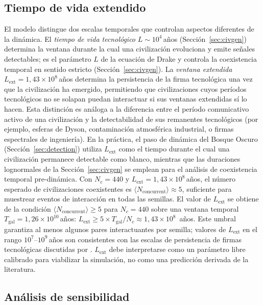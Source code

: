 \documentclass[11pt,a4paper,onecolumn]{article}
\begin{document}
\subsection{Tiempo de vida extendido}
\label{sec:lifetime}

El modelo distingue dos escalas temporales que controlan aspectos
diferentes de la dinámica.
El \emph{tiempo de vida tecnológico} $L \sim 10^4$\,años
(Sección~\ref{sec:civgen}) determina la ventana durante la cual una
civilización evoluciona y emite señales detectables; es el parámetro $L$
de la ecuación de Drake y controla la coexistencia temporal en sentido
estricto (Sección~\ref{sec:civgen}).
La \emph{ventana extendida} $L_\text{ext} = 1{,}43\times10^8$\,años
\citep{sandberg2018} determina la persistencia de la firma tecnológica
una vez que la civilización ha emergido, permitiendo que civilizaciones
cuyos períodos tecnológicos no se solapan puedan interactuar si sus
ventanas extendidas sí lo hacen.
Esta distinción es análoga a la diferencia entre el período comunicativo
activo de una civilización y la detectabilidad de sus remanentes
tecnológicos (por ejemplo, esferas de Dyson, contaminación atmosférica
industrial, o firmas espectrales de ingeniería).
En la práctica, el paso de dinámica del Bosque Oscuro
(Sección~\ref{sec:detection}) utiliza $L_\text{ext}$ como el tiempo
durante el cual una civilización permanece detectable como blanco,
mientras que las duraciones lognormales de la Sección~\ref{sec:civgen}
se emplean para el análisis de coexistencia temporal pre-dinámica.
Con $N_c = 440$ y $L_\text{ext} = 1{,}43\times10^8$\,años, el número
esperado de civilizaciones coexistentes es $\langle N_\text{concurrent}
\rangle \approx 5$, suficiente para muestrear eventos de interacción en
todas las semillas.
El valor de $L_\text{ext}$ se obtiene de la condición
$\langle N_\text{concurrent} \rangle \geq 5$ para $N_c = 440$ sobre una
ventana temporal $T_\text{gal} = 1{,}26\times10^{10}$\,años:
$L_\text{ext} \geq 5 \times T_\text{gal} / N_c \approx 1{,}43\times10^8$
\,años.
Este umbral garantiza al menos algunos pares interactuantes por semilla;
valores de $L_\text{ext}$ en el rango $10^7$--$10^9$\,años son
consistentes con las escalas de persistencia de firmas tecnológicas
discutidas por \citet{sandberg2018}.
$L_\text{ext}$ debe interpretarse como un parámetro libre calibrado
para viabilizar la simulación, no como una predicción derivada de la
literatura.

\subsection{Análisis de sensibilidad}
\label{sec:sobol}
\end{document}
